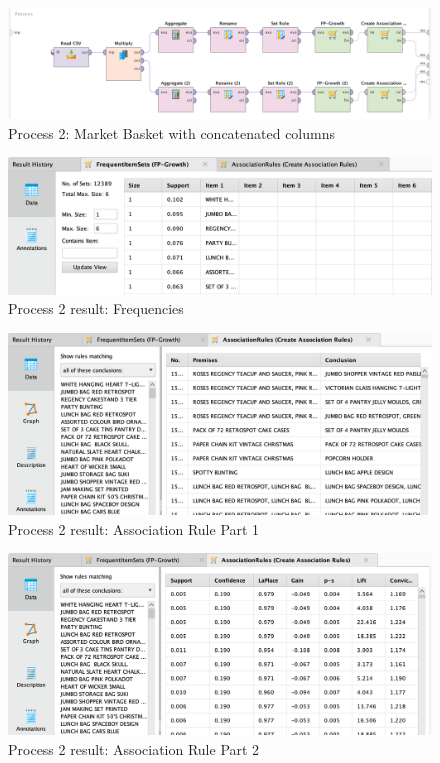 \documentclass[a4paper]{article}
\begin{document}
\begin{figure}[H]
	\includegraphics[width=\linewidth]{imgs/part_2/2_full_process_2}
	\caption{Process 2: Market Basket with concatenated columns}
	\label{fig:2_full_process_2}
\end{figure}

\begin{figure}[H]
	\centering
	\includegraphics[width=\linewidth/1]{imgs/part_2/2_process_2_results_freq}
	\caption{Process 2 result: Frequencies}
	\label{fig:2_process_2_results_freq}
\end{figure}

\begin{figure}[H]
	\centering
	\includegraphics[width=\linewidth/1]{imgs/part_2/2_process_2_results_1_assoc_1}
	\caption{Process 2 result: Association Rule Part 1}
	\label{fig:2_process_2_results_1_assoc_1}
\end{figure}

\begin{figure}[H]
	\centering
	\includegraphics[width=\linewidth/1]{imgs/part_2/2_process_2_results_1_assoc_2}
	\caption{Process 2 result: Association Rule Part 2}
	\label{fig:2_process_2_results_1_assoc_2}
\end{figure}
\end{document}
